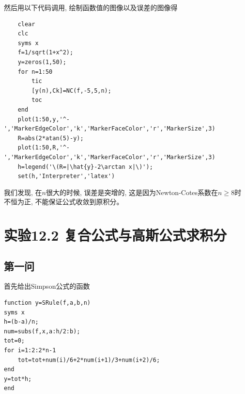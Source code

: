 \documentclass[10pt]{SelfArx} %
\numberwithin{dummy}{section}
\begin{document}
然后用以下代码调用, 绘制函数值的图像以及误差的图像得
\begin{lstlisting}
	clear
	clc
	syms x
	f=1/sqrt(1+x^2);
	y=zeros(1,50);
	for n=1:50
		tic
		[y(n),Ck]=NC(f,-5,5,n);
		toc
	end
	plot(1:50,y,'^-','MarkerEdgeColor','k','MarkerFaceColor','r','MarkerSize',3)
	R=abs(2*atan(5)-y);
	plot(1:50,R,'^-','MarkerEdgeColor','k','MarkerFaceColor','r','MarkerSize',3)
	h=legend('\(R=|\hat{y}-2\arctan x|\)');
	set(h,'Interpreter','latex')
\end{lstlisting}
\begin{figure}[h]
	\centering
\end{figure}

我们发现, 在$n$很大的时候, 误差是突增的, 这是因为Newton-Cotes系数在$n\geqslant 8$时不恒为正, 不能保证公式收敛到原积分。
\section{实验12.2 复合公式与高斯公式求积分}
\subsection{第一问}
首先给出Simpson公式的函数
\begin{lstlisting}
function y=SRule(f,a,b,n)
syms x
h=(b-a)/n;
num=subs(f,x,a:h/2:b);
tot=0;
for i=1:2:2*n-1
	tot=tot+num(i)/6+2*num(i+1)/3+num(i+2)/6;
end
y=tot*h;
end
\end{lstlisting}
\end{document}
